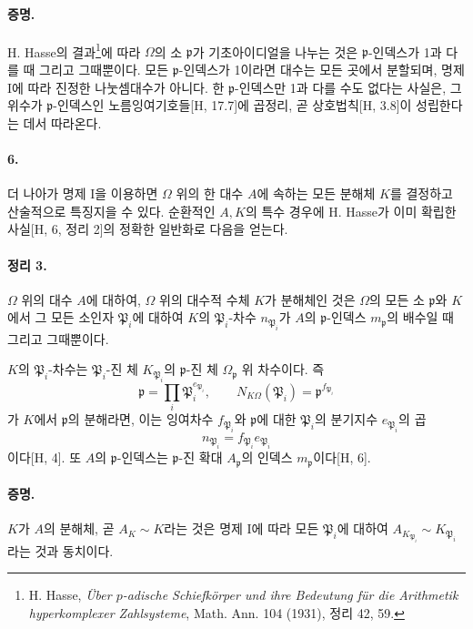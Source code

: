 \paragraph{증명.}
H. Hasse의 결과\footnote{\label{fn:p38-hasse-padisch}H. Hasse, \emph{Über \(p\)-adische Schiefkörper und ihre Bedeutung für die Arithmetik hyperkomplexer Zahlsysteme}, Math. Ann. 104 (1931), 정리 42, 59.}에 따라 \(\Omega\)의 소 \(\mathfrak p\)가 기초아이디얼을 나누는 것은 \(\mathfrak p\)-인덱스가 1과 다를 때 그리고 그때뿐이다. 모든 \(\mathfrak p\)-인덱스가 1이라면 대수는 모든 곳에서 분할되며, 명제 I에 따라 진정한 나눗셈대수가 아니다. 한 \(\mathfrak p\)-인덱스만 1과 다를 수도 없다는 사실은, 그 위수가 \(\mathfrak p\)-인덱스인 노름잉여기호들[H, 17.7]에 곱정리, 곧 상호법칙[H, 3.8]이 성립한다는 데서 따라온다.

\paragraph{6.}
더 나아가 명제 I을 이용하면 \(\Omega\) 위의 한 대수 \(A\)에 속하는 모든 분해체 \(K\)를 결정하고 산술적으로 특징지을 수 있다. 순환적인 \(A,K\)의 특수 경우에 H. Hasse가 이미 확립한 사실[H, 6, 정리 2]의 정확한 일반화로 다음을 얻는다.

\paragraph{정리 3.}
\(\Omega\) 위의 대수 \(A\)에 대하여, \(\Omega\) 위의 대수적 수체 \(K\)가 분해체인 것은 \(\Omega\)의 모든 소 \(\mathfrak p\)와 \(K\)에서 그 모든 소인자 \(\mathfrak P_i\)에 대하여 \(K\)의 \(\mathfrak P_i\)-차수 \(n_{\mathfrak P_i}\)가 \(A\)의 \(\mathfrak p\)-인덱스 \(m_{\mathfrak p}\)의 배수일 때 그리고 그때뿐이다.

\(K\)의 \(\mathfrak P_i\)-차수는 \(\mathfrak P_i\)-진 체 \(K_{\mathfrak P_i}\)의 \(\mathfrak p\)-진 체 \(\Omega_{\mathfrak p}\) 위 차수이다. 즉
\[
\mathfrak p=\prod_i\mathfrak P_i^{e_{\mathfrak P_i}},
\qquad
N_{K\Omega}(\mathfrak P_i)=\mathfrak p^{f_{\mathfrak P_i}}
\]
가 \(K\)에서 \(\mathfrak p\)의 분해라면, 이는 잉여차수 \(f_{\mathfrak P_i}\)와 \(\mathfrak p\)에 대한 \(\mathfrak P_i\)의 분기지수 \(e_{\mathfrak P_i}\)의 곱
\[
n_{\mathfrak P_i}=f_{\mathfrak P_i}e_{\mathfrak P_i}
\]
이다[H, 4]. 또 \(A\)의 \(\mathfrak p\)-인덱스는 \(\mathfrak p\)-진 확대 \(A_{\mathfrak p}\)의 인덱스 \(m_{\mathfrak p}\)이다[H, 6].

\paragraph{증명.}
\(K\)가 \(A\)의 분해체, 곧 \(A_K\sim K\)라는 것은 명제 I에 따라 모든 \(\mathfrak P_i\)에 대하여 \(A_{K_{\mathfrak P_i}}\sim K_{\mathfrak P_i}\)라는 것과 동치이다.

